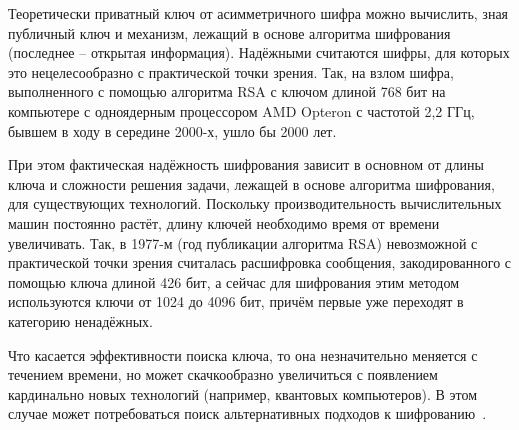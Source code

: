 Теоретически приватный ключ от асимметричного шифра можно вычислить, зная публичный ключ и механизм, лежащий в основе алгоритма шифрования (последнее -- открытая информация). Надёжными считаются шифры, для которых это нецелесообразно с практической точки зрения. Так, на взлом шифра, выполненного с помощью алгоритма RSA с ключом длиной 768 бит на компьютере с одноядерным процессором AMD Opteron с частотой 2,2 ГГц, бывшем в ходу в середине 2000-х, ушло бы 2000 лет.

При этом фактическая надёжность шифрования зависит в основном от длины ключа и сложности решения задачи, лежащей в основе алгоритма шифрования, для существующих технологий. Поскольку производительность вычислительных машин постоянно растёт, длину ключей необходимо время от времени увеличивать. Так, в 1977-м (год публикации алгоритма RSA) невозможной с практической точки зрения считалась расшифровка сообщения, закодированного с помощью ключа длиной 426 бит, а сейчас для шифрования этим методом используются ключи от 1024 до 4096 бит, причём первые уже переходят в категорию ненадёжных.

Что касается эффективности поиска ключа, то она незначительно меняется с течением времени, но может скачкообразно увеличиться с появлением кардинально новых технологий (например, квантовых компьютеров). В этом случае может потребоваться поиск альтернативных подходов к шифрованию~\cite{asim-kasp}.
